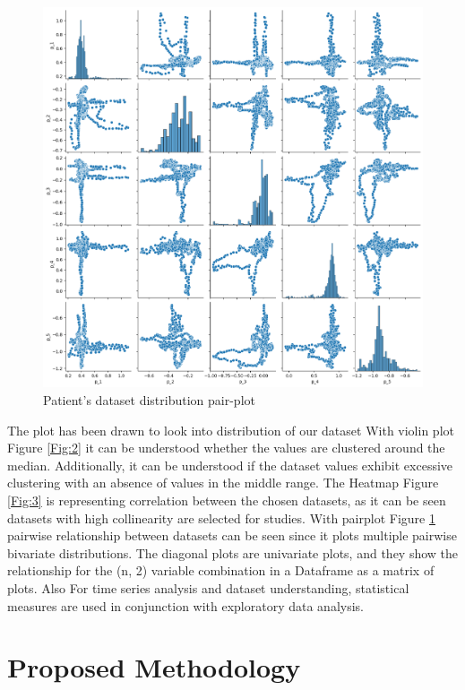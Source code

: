 \documentclass[a4paper, fleqn]{cas-sc}
\begin{document}
   \begin{figure}[h!]
    \centering
     \includegraphics[scale=.52]{pair_plot.png}
     \caption{Patient's dataset distribution pair-plot}
    \label{Fig:4}
   \end{figure}
  

 
 The plot has been drawn to look into distribution of our dataset With violin plot Figure  \ref{Fig:2} it can be understood whether the values are clustered around the median. Additionally,  it can be understood if the dataset values exhibit excessive clustering with an absence of values in the middle range. The Heatmap Figure  \ref{Fig:3} is representing correlation between the chosen datasets,  as it can be seen datasets with high collinearity are selected for studies. With pairplot Figure  \ref{Fig:4} pairwise relationship between datasets can be seen since it plots multiple pairwise bivariate distributions. The diagonal plots are univariate plots, and they show the relationship for the (n,  2) variable combination in a Dataframe as a matrix of plots.
Also  For time series analysis and dataset understanding,  statistical measures are used in conjunction with exploratory data analysis.
 
 
 
 
 \section{Proposed Methodology}
 
\end{document}
